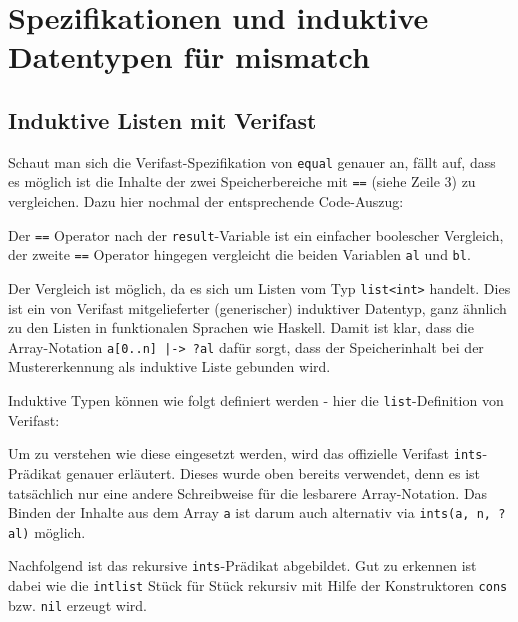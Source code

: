 ﻿\section{Spezifikationen und induktive Datentypen für mismatch}
\subsection{Induktive Listen mit Verifast}
\label{sec:induktive-listen}

Schaut man sich die Verifast-Spezifikation von \lstinline{equal} genauer an, fällt auf, dass es 
möglich ist die Inhalte der zwei Speicherbereiche mit \lstinline{==} (siehe Zeile 3) zu vergleichen. 
Dazu hier nochmal der entsprechende Code-Auszug:



Der \lstinline{==} Operator nach der \lstinline{result}-Variable ist ein einfacher boolescher Vergleich,
der zweite \lstinline{==} Operator hingegen vergleicht die beiden Variablen \lstinline{al} und \lstinline{bl}.

Der Vergleich ist möglich, da es sich um Listen vom Typ \lstinline{list<int>} handelt. Dies ist ein
von Verifast mitgelieferter (generischer) induktiver Datentyp, ganz ähnlich zu den Listen in funktionalen 
Sprachen wie Haskell. Damit ist klar, dass die Array-Notation \lstinline{a[0..n] |-> ?al} dafür sorgt, 
dass der Speicherinhalt bei der Mustererkennung als induktive Liste gebunden wird.

Induktive Typen können wie folgt definiert werden - hier die \lstinline{list}-Definition von Verifast:



Um zu verstehen wie diese eingesetzt werden, wird das offizielle Verifast \lstinline{ints}-Prädikat genauer
erläutert. Dieses wurde oben bereits verwendet, denn es ist tatsächlich nur eine andere Schreibweise für die 
lesbarere Array-Notation. Das Binden der Inhalte aus dem Array \lstinline{a} ist darum auch alternativ via 
\lstinline{ints(a, n, ?al)} möglich.

Nachfolgend ist das rekursive \lstinline{ints}-Prädikat abgebildet. Gut zu erkennen ist dabei
wie die \lstinline{intlist} Stück für Stück rekursiv mit Hilfe der Konstruktoren
\lstinline{cons} bzw. \lstinline{nil} erzeugt wird.




